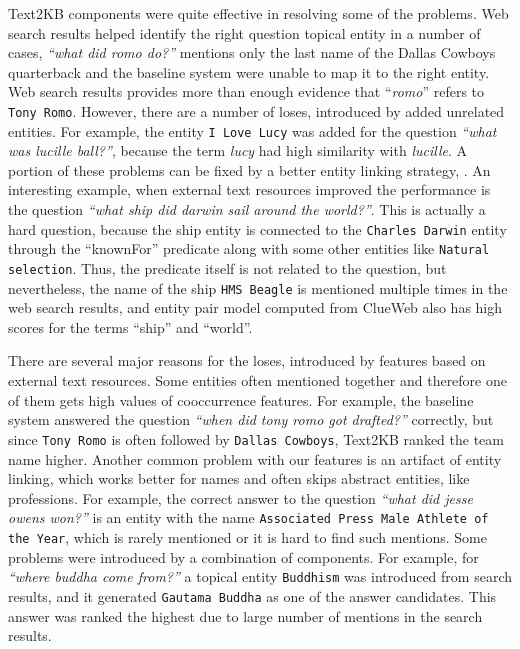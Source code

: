 Text2KB components were quite effective in resolving some of the problems.
Web search results helped identify the right question topical entity in a number of cases, \eg \textit{``what did romo do?''} mentions only the last name of the Dallas Cowboys quarterback and the baseline system were unable to map it to the right entity.
Web search results provides more than enough evidence that ``\textit{romo}'' refers to \texttt{Tony Romo}.
However, there are a number of loses, introduced by added unrelated entities.
For example, the entity \texttt{I Love Lucy} was added for the question \textit{``what was lucille ball?''}, because the term \textit{lucy} had high similarity with \textit{lucille}.
A portion of these problems can be fixed by a better entity linking strategy, \eg \cite{SMAPH_ERD:2014}.
An interesting example, when external text resources improved the performance is the question \textit{``what ship did darwin sail around the world?''}.
This is actually a hard question, because the ship entity is connected to the \texttt{Charles Darwin} entity through the ``knownFor'' predicate along with some other entities like \texttt{Natural selection}.
Thus, the predicate itself is not related to the question, but nevertheless, the name of the ship \texttt{HMS Beagle} is mentioned multiple times in the web search results, and entity pair model computed from ClueWeb also has high scores for the terms ``ship'' and ``world''.

There are several major reasons for the loses, introduced by features based on external text resources.
Some entities often mentioned together and therefore one of them gets high values of cooccurrence features.
For example, the baseline system answered the question \textit{``when did tony romo got drafted?''} correctly, but since \texttt{Tony Romo} is often followed by \texttt{Dallas Cowboys}, Text2KB ranked the team name higher.
Another common problem with our features is an artifact of entity linking, which works better for names and often skips abstract entities, like professions.
For example, the correct answer to the question \textit{``what did jesse owens won?''} is an entity with the name \texttt{Associated Press Male Athlete of the Year}, which is rarely mentioned or it is hard to find such mentions.
Some problems were introduced by a combination of components.
For example, for \textit{``where buddha come from?''} a topical entity \texttt{Buddhism} was introduced from search results, and it generated \texttt{Gautama Buddha} as one of the answer candidates.
This answer was ranked the highest due to large number of mentions in the search results.

